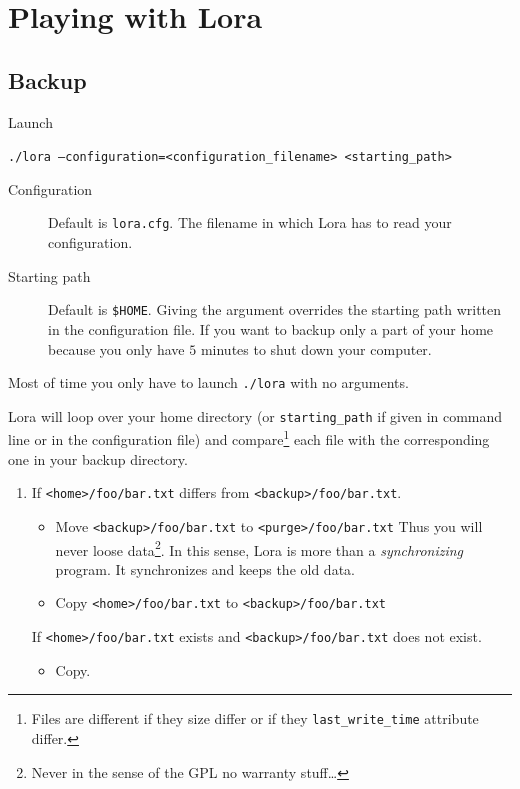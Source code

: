 \documentclass[a4paper,12pt]{article}
\newcommand{\info}[1]{\texttt{#1}}
\begin{document}
\section{Playing with Lora}

\subsection{Backup}

Launch
\begin{center}
      \info{./lora --configuration=<configuration\_filename>  <starting\_path>  }
\end{center}

\begin{description}
    \item[Configuration] Default is \info{lora.cfg}. The filename in which Lora has to read your configuration.
    \item[Starting path] Default is \info{\$HOME}. Giving the argument overrides the starting path written in the configuration file. If you want to backup only a part of your home because you only have \( 5\) minutes to shut down your computer.
\end{description}
Most of time you only have to launch \info{./lora} with no arguments.

Lora will loop over your home directory (or \info{starting\_path} if given in command line or in the configuration file) and compare\footnote{Files are different if they size differ or if they \info{last\_write\_time} attribute differ.} each file with the corresponding one in your backup directory. 
\begin{enumerate}
    \item
        If \info{<home>/foo/bar.txt} differs from \info{<backup>/foo/bar.txt}. 
        \begin{itemize}
            \item Move \info{<backup>/foo/bar.txt} to \info{<purge>/foo/bar.txt} Thus you will never loose data\footnote{Never in the sense of the GPL no warranty stuff\ldots}. In this sense, Lora is more than a \emph{synchronizing} program. It synchronizes and keeps the old data.
            \item Copy \info{<home>/foo/bar.txt} to \info{<backup>/foo/bar.txt}
        \end{itemize}
        If \info{<home>/foo/bar.txt} exists and \info{<backup>/foo/bar.txt} does not exist.
        \begin{itemize}
            \item Copy.
        \end{itemize}
\end{enumerate}
\end{document}
